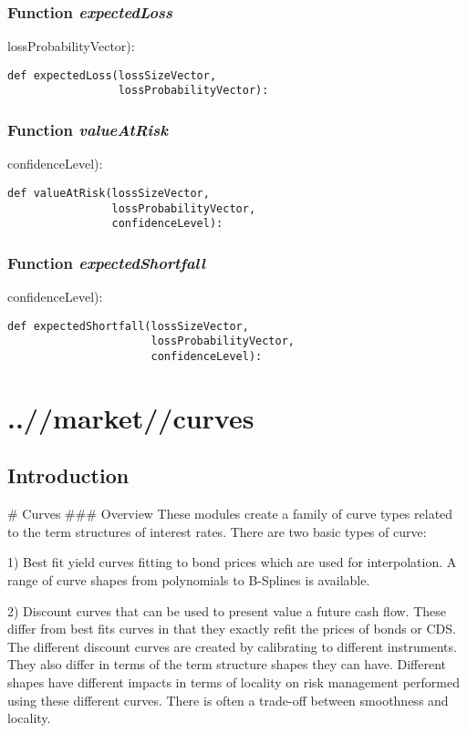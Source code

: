 \documentclass[twoside,11pt]{book}
\begin{document}
\subsection{Function {\it expectedLoss}}
lossProbabilityVector):

\begin{lstlisting}
def expectedLoss(lossSizeVector,
                 lossProbabilityVector):
\end{lstlisting}

\subsection{Function {\it valueAtRisk}}
confidenceLevel):

\begin{lstlisting}
def valueAtRisk(lossSizeVector,
                lossProbabilityVector,
                confidenceLevel):
\end{lstlisting}

\subsection{Function {\it expectedShortfall}}
confidenceLevel):

\begin{lstlisting}
def expectedShortfall(lossSizeVector,
                      lossProbabilityVector,
                      confidenceLevel):
\end{lstlisting}


\chapter{..//market//curves}
\section{Introduction}
# Curves
### Overview
These modules create a family of curve types related to the term structures of interest rates. There are two basic types of curve:

1) Best fit yield curves fitting to bond prices which are used for interpolation. A range of curve shapes from polynomials to B-Splines is available.

2) Discount curves that can be used to present value a future cash flow. These differ from best fits curves in that they exactly refit the prices of bonds or CDS. The different discount curves are created by calibrating to different instruments. They also differ in terms of the term structure shapes they can have. Different shapes have different impacts in terms of locality on risk management performed using these different curves. There is often a trade-off between smoothness and locality.
\end{document}
